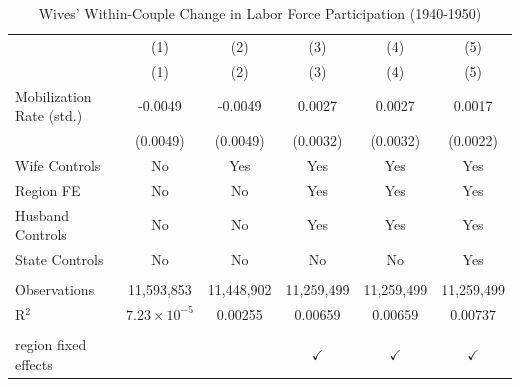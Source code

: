 
\begin{table}[htbp]
   \caption{\label{tab:wives_main} Wives' Within-Couple Change in Labor Force Participation (1940-1950)}
   \bigskip
   \centering
   \begin{tabular}{lccccc}
      \toprule
                               & (1)                   & (2)        & (3)           & (4)           & (5) \\   
                               & (1)                   & (2)        & (3)           & (4)           & (5)\\  
      \midrule 
      Mobilization Rate (std.) & -0.0049               & -0.0049    & 0.0027        & 0.0027        & 0.0017\\   
                               & (0.0049)              & (0.0049)   & (0.0032)      & (0.0032)      & (0.0022)\\   
      Wife Controls            & No                    & Yes        & Yes           & Yes           & Yes\\  
      Region FE                & No                    & No         & Yes           & Yes           & Yes\\  
      Husband Controls         & No                    & No         & Yes           & Yes           & Yes\\  
      State Controls           & No                    & No         & No            & No            & Yes\\  
       \\
      Observations             & 11,593,853            & 11,448,902 & 11,259,499    & 11,259,499    & 11,259,499\\  
      R$^2$                    & $7.23\times 10^{-5}$  & 0.00255    & 0.00659       & 0.00659       & 0.00737\\  
       \\
      region fixed effects     &                       &            & $\checkmark$  & $\checkmark$  & $\checkmark$\\   
      \bottomrule
   \end{tabular}
\end{table}


